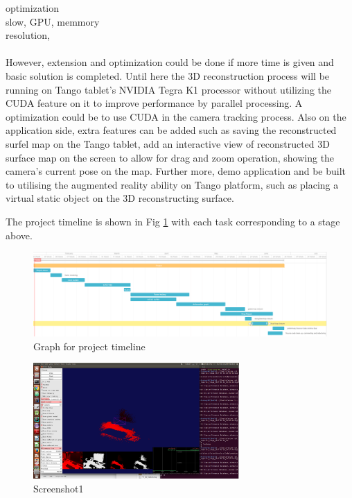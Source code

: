 \documentclass[12pt,twoside]{article}
\begin{document}
optimization \\
slow, GPU, memmory\\
resolution, \\
\\
However, extension and optimization could be done if more time is given and basic solution is completed. Until here the 3D reconstruction process will be running on Tango tablet's NVIDIA Tegra K1 processor without utilizing the CUDA feature on it to improve performance by parallel processing. A optimization could be to use CUDA in the camera tracking process. Also on the application side, extra features can be added such as saving the reconstructed surfel map on the Tango tablet, add an interactive view of reconstructed 3D surface map on the screen to allow for drag and zoom operation, showing the camera's current pose on the map. Further more, demo application and be built to utilising the augmented reality ability on Tango platform, such as placing a virtual static object on the 3D reconstructing surface.\\



\newpage



\newpage




The project timeline is shown in Fig \ref{fig:tiemline2} with each task corresponding to a stage above.

\begin{figure}
\centering
    \includegraphics[angle=90,width=\textwidth,height=\textheight,keepaspectratio]{figures/timeline2}
   \caption{Graph for project timeline}
    \label{fig:tiemline2}
\end{figure}



\begin{figure}[h]
    \centering
    \includegraphics[width=0.7\textwidth]{figures/Screenshot1}
    \caption{Screenshot1}
    \label{fig:Screenshot1}
\end{figure}
\end{document}
